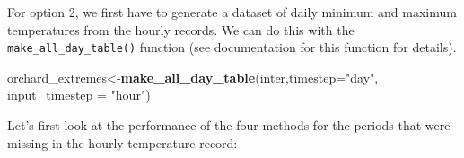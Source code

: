 \documentclass[
]{book}
\newenvironment{Shaded}{\begin{snugshade}}{\end{snugshade}}
\newcommand{\DataTypeTok}[1]{\textcolor[rgb]{0.13,0.29,0.53}{#1}}
\newcommand{\KeywordTok}[1]{\textcolor[rgb]{0.13,0.29,0.53}{\textbf{#1}}}
\newcommand{\NormalTok}[1]{#1}
\newcommand{\StringTok}[1]{\textcolor[rgb]{0.31,0.60,0.02}{#1}}
\begin{document}
For option 2, we first have to generate a dataset of daily minimum and maximum temperatures from the hourly records. We can do this with the \texttt{make\_all\_day\_table()} function (see documentation for this function for details).

\begin{Shaded}
\begin{Highlighting}[]
\NormalTok{orchard_extremes<-}\KeywordTok{make_all_day_table}\NormalTok{(inter,}\DataTypeTok{timestep=}\StringTok{"day"}\NormalTok{,}
                                     \DataTypeTok{input_timestep =} \StringTok{"hour"}\NormalTok{)}
\end{Highlighting}
\end{Shaded}

Let's first look at the performance of the four methods for the periods that were missing in the hourly temperature record:
\end{document}
